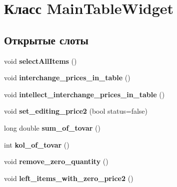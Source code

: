 \hypertarget{class_main_table_widget}{\section{Класс \-Main\-Table\-Widget}
\label{class_main_table_widget}
}
\subsection*{Открытые слоты}
\begin{DoxyCompactItemize}
\item 
\hypertarget{class_main_table_widget_a21e21d4fe7751de6fe628c15a3fc232e}{void {\bfseries select\-All\-Items} ()}\label{class_main_table_widget_a21e21d4fe7751de6fe628c15a3fc232e}

\item 
\hypertarget{class_main_table_widget_a3b35976366320bcf5a6d62e0c61f216d}{void {\bfseries interchange\-\_\-prices\-\_\-in\-\_\-table} ()}\label{class_main_table_widget_a3b35976366320bcf5a6d62e0c61f216d}

\item 
\hypertarget{class_main_table_widget_a1ea6f65677fa64572ba0310bbde9d7c7}{void {\bfseries intellect\-\_\-interchange\-\_\-prices\-\_\-in\-\_\-table} ()}\label{class_main_table_widget_a1ea6f65677fa64572ba0310bbde9d7c7}

\item 
\hypertarget{class_main_table_widget_a5706176d7bbc4eecd9dec68597c9d236}{void {\bfseries set\-\_\-editing\-\_\-price2} (bool status=false)}\label{class_main_table_widget_a5706176d7bbc4eecd9dec68597c9d236}

\item 
\hypertarget{class_main_table_widget_aeba561f87ca40b1783c37fd2af337532}{long double {\bfseries sum\-\_\-of\-\_\-tovar} ()}\label{class_main_table_widget_aeba561f87ca40b1783c37fd2af337532}

\item 
\hypertarget{class_main_table_widget_aee03080c6d137ce86c0a3323bf94e188}{int {\bfseries kol\-\_\-of\-\_\-tovar} ()}\label{class_main_table_widget_aee03080c6d137ce86c0a3323bf94e188}

\item 
\hypertarget{class_main_table_widget_a9421cc4e7304985d559962092aff90d4}{void {\bfseries remove\-\_\-zero\-\_\-quantity} ()}\label{class_main_table_widget_a9421cc4e7304985d559962092aff90d4}

\item 
\hypertarget{class_main_table_widget_ae407cebc3bf597d17b6f022f39cbcbfa}{void {\bfseries left\-\_\-items\-\_\-with\-\_\-zero\-\_\-price2} ()}\label{class_main_table_widget_ae407cebc3bf597d17b6f022f39cbcbfa}

\end{DoxyCompactItemize}
